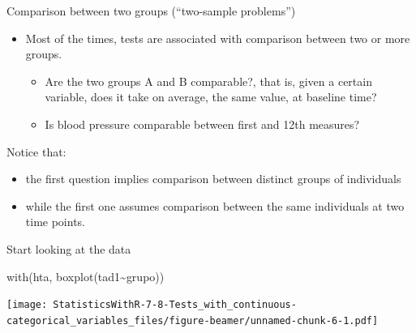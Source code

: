 \documentclass[
  ignorenonframetext,
]{beamer}
\newenvironment{Shaded}{\begin{snugshade}}{\end{snugshade}}
\newcommand{\FunctionTok}[1]{\textcolor[rgb]{0.00,0.00,0.00}{#1}}
\newcommand{\NormalTok}[1]{#1}
\newcommand{\SpecialCharTok}[1]{\textcolor[rgb]{0.00,0.00,0.00}{#1}}
\providecommand{\tightlist}{%
  \setlength{\itemsep}{0pt}\setlength{\parskip}{0pt}}
\begin{document}
\begin{frame}{Comparison between two groups (``two-sample problems'')}
\protect\hypertarget{comparison-between-two-groups-two-sample-problems}{}
\begin{itemize}
\item
  Most of the times, tests are associated with comparison between two or
  more groups.

  \begin{itemize}
  \tightlist
  \item
    Are the two groups A and B comparable?, that is, given a certain
    variable, does it take on average, the same value, at baseline time?
  \item
    Is blood pressure comparable between first and 12th measures?
  \end{itemize}
\end{itemize}

Notice that:

\begin{itemize}
\tightlist
\item
  the first question implies comparison between distinct groups of
  individuals
\item
  while the first one assumes comparison between the same individuals at
  two time points.
\end{itemize}
\end{frame}

\begin{frame}[fragile]{Start looking at the data}
\protect\hypertarget{start-looking-at-the-data}{}
\begin{Shaded}
\begin{Highlighting}[]
\FunctionTok{with}\NormalTok{(hta, }\FunctionTok{boxplot}\NormalTok{(tad1}\SpecialCharTok{\textasciitilde{}}\NormalTok{grupo))}
\end{Highlighting}
\end{Shaded}

\texttt{[image: StatisticsWithR-7-8-Tests\_with\_continuous-categorical\_variables\_files/figure-beamer/unnamed-chunk-6-1.pdf]}
\end{frame}
\end{document}
